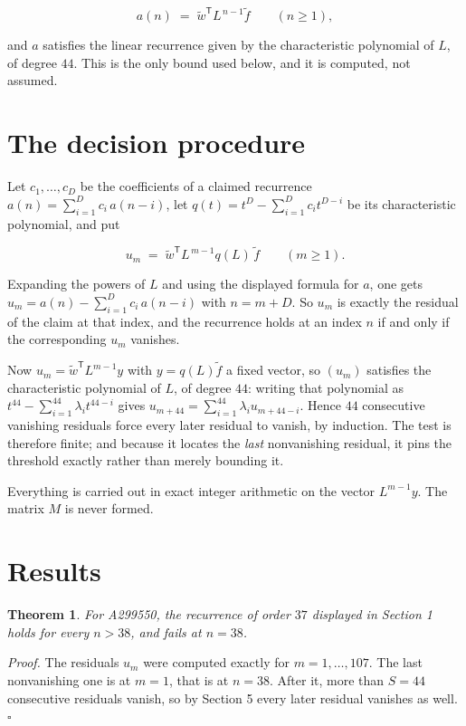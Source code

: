 \documentclass[11pt]{article}
\newtheorem{theorem}{Theorem}
\theoremstyle{definition}
\begin{document}
\[a(n) \;=\; \tilde w^{\mathsf T} L^{\,n-1} \tilde f \qquad (n \ge 1),\]

and $a$ satisfies the linear recurrence given by the characteristic polynomial of $L$, of degree $44$. This is the only bound used below, and it is computed, not assumed.

\section{The decision procedure}

Let $c_1,\dots,c_D$ be the coefficients of a claimed recurrence $a(n) = \sum_{i=1}^{D} c_i\,a(n-i)$, let $q(t) = t^{D} - \sum_{i=1}^{D} c_i t^{D-i}$ be its characteristic polynomial, and put

\[u_m \;=\; \tilde w^{\mathsf T} L^{\,m-1} q(L)\,\tilde f \qquad (m \ge 1).\]

Expanding the powers of $L$ and using the displayed formula for $a$, one gets $u_m = a(n) - \sum_{i=1}^{D} c_i\,a(n-i)$ with $n = m + D$. So $u_m$ is exactly the residual of the claim at that index, and the recurrence holds at an index $n$ if and only if the corresponding $u_m$ vanishes.

Now $u_m = \tilde w^{\mathsf T} L^{m-1} y$ with $y = q(L)\tilde f$ a fixed vector, so $(u_m)$ satisfies the characteristic polynomial of $L$, of degree $44$: writing that polynomial as $t^{44} - \sum_{i=1}^{44} \lambda_i t^{44-i}$ gives $u_{m+44} = \sum_{i=1}^{44} \lambda_i u_{m+44-i}$. Hence $44$ consecutive vanishing residuals force every later residual to vanish, by induction. The test is therefore finite; and because it locates the {\itshape last} nonvanishing residual, it pins the threshold exactly rather than merely bounding it.

Everything is carried out in exact integer arithmetic on the vector $L^{m-1}y$. The matrix $M$ is never formed.

\section{Results}

\begin{theorem} For A299550, the recurrence of order $37$ displayed in Section 1 holds for every $n > 38$, and fails at $n = 38$.\end{theorem}

{\itshape Proof.} The residuals $u_m$ were computed exactly for $m = 1,\dots,107$. The last nonvanishing one is at $m = 1$, that is at $n = 38$. After it, more than $S = 44$ consecutive residuals vanish, so by Section 5 every later residual vanishes as well. $\square$
\end{document}
